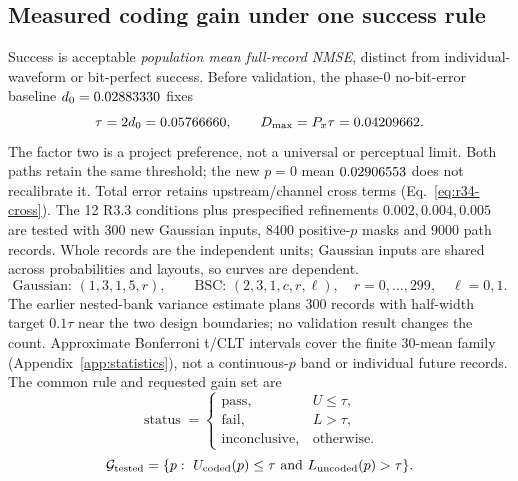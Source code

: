 \FloatBarrier
\subsection{Measured coding gain under one success rule}
\label{sec:r34}
Success is acceptable \emph{population mean full-record NMSE}, distinct
from individual-waveform or bit-perfect success. Before validation,
the phase-0 no-bit-error baseline $ d_0=0.02883330 $ fixes
\begin{equation}
 \tau=2d_0=0.05766660,\qquad
 D_{\max}=P_x\tau=0.04209662.
 \label{eq:r34-budget}
\end{equation}
The factor two is a project preference, not a universal or perceptual limit.
Both paths retain the same threshold; the new $ p=0 $ mean $0.02906553 $
does not recalibrate it. Total error retains upstream/channel cross terms
(Eq.~\eqref{eq:r34-cross}).
The 12 R3.3 conditions plus prespecified refinements $0.002,0.004,0.005 $
are tested with 300 new Gaussian inputs, 8400 positive-$ p $ masks and 9000
path records. Whole records are the independent units; Gaussian inputs
are shared across probabilities and layouts, so curves are dependent.
\begin{equation}
 \text{Gaussian: }(1,3,1,5,r),\qquad
 \text{BSC: }(2,3,1,c,r,\ell),\quad r=0,\ldots,299,\quad\ell=0,1.
 \label{eq:r34-paths}
\end{equation}
The earlier nested-bank variance estimate plans 300 records with half-width
target $0.1\tau $ near the two design boundaries; no validation result
changes the count. Approximate Bonferroni t/CLT intervals cover the finite
30-mean family (Appendix~\ref{app:statistics}), not a continuous-$ p $ band
or individual future records. The common rule and requested gain set are
\begin{equation}
 \operatorname{status}=
 \begin{cases}
 \mathrm{pass},&U\le\tau,\\
 \mathrm{fail},&L>\tau,\\
 \mathrm{inconclusive},&\text{otherwise}.
 \end{cases}
 \label{eq:r34-decision}
\end{equation}
\begin{equation}
 \mathcal G_{\rm tested}=
 \{p:\ U_{\rm coded}(p)\le\tau
          \ \text{and}\ L_{\rm uncoded}(p)>\tau\}.
 \label{eq:r34-gain}
\end{equation}

\begin{table}[htbp]
 \centering\small
 \caption{Independent NMSE means and approximate 30-family intervals, 300 records per path/condition. Gain means coded pass and uncoded fail at the same fixed threshold; decisions use unrounded CSV.}
 \label{tab:r34-quality}
 
 
 
\end{table}


